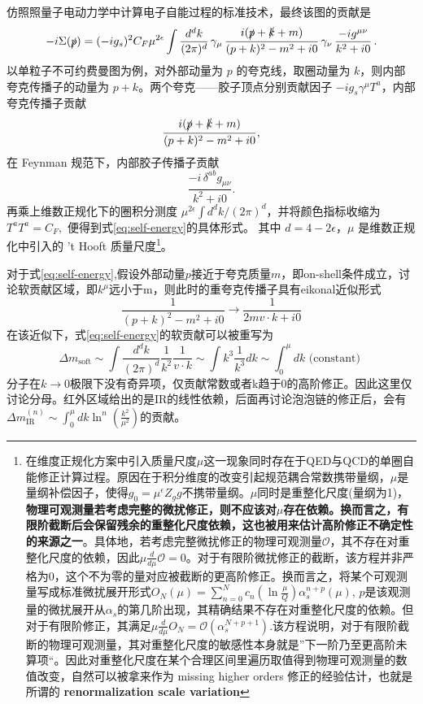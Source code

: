 仿照照量子电动力学中计算电子自能过程的标准技术，最终该图的贡献是
\begin{equation}
    -i \Sigma(\slashed{p})
=
(-i g_s)^2 C_F \mu^{2\epsilon}
\int \frac{d^d k}{(2\pi)^d}\,
\gamma_\mu\,
\frac{i(\slashed{p}+\slashed{k}+m)}{(p+k)^2-m^2+i0}\,
\gamma_\nu\,
\frac{-i g^{\mu\nu}}{k^2+i0}\,.
\label{eq:self-energy}
\end{equation}
以单粒子不可约费曼图为例，对外部动量为 $p$ 的夸克线，取圈动量为 $k$，则内部夸克传播子的动量为 $p+k$。两个夸克——胶子顶点分别贡献因子 $-ig_s\gamma^\mu T^a$，内部夸克传播子贡献
\[
\frac{i(\slashed p+\slashed k+m)}{(p+k)^2-m^2+i0},
\]
在 Feynman 规范下，内部胶子传播子贡献
\[
\frac{-i\,\delta^{ab}g_{\mu\nu}}{k^2+i0}.
\]
再乘上维数正规化下的圈积分测度 $\mu^{2\epsilon}\!\int d^d k/(2\pi)^d$，并将颜色指标收缩为$T^aT^a=C_F,$
便得到式\eqref{eq:self-energy}的具体形式。 
其中 $d=4-2\epsilon$，$\mu$ 是维数正规化中引入的 ’t Hooft 质量尺度\footnote{在维度正规化方案中引入质量尺度$\mu$这一现象同时存在于QED与QCD的单圈自能修正计算过程。原因在于积分维度的改变引起规范耦合常数携带量纲，$\mu$是量纲补偿因子，使得$g_0=\mu^{\epsilon}Z_g g$不携带量纲。$\mu$同时是重整化尺度(量纲为1)，\textbf{物理可观测量若考虑完整的微扰修正，则不应该对$\mu$存在依赖。换而言之，有限阶截断后会保留残余的重整化尺度依赖，这也被用来估计高阶修正不确定性的来源之一}。具体地，若考虑完整微扰修正的物理可观测量$\mathcal{O}$，其不存在对重整化尺度的依赖，因此$\mu\frac{d}{d \mu}\mathcal{O}=0$。对于有限阶微扰修正的截断，该方程并非严格为0，这个不为零的量对应被截断的更高阶修正。换而言之，将某个可观测量写成标准微扰展开形式$O_N(\mu)=\sum_{n=0}^N c_n\left(\ln \frac{\mu}{Q}\right) \alpha_s^{n+p}(\mu)$, $p$是该观测量的微扰展开从$\alpha_s$的第几阶出现，其精确结果不存在对重整化尺度的依赖。但对于有限阶修正，其满足$\mu \frac{d}{d \mu} O_N=\mathcal{O}\left(\alpha_s^{N+p+1}\right)$.该方程说明，对于有限阶截断的物理可观测量，其对重整化尺度的敏感性本身就是”下一阶乃至更高阶未算项“。因此对重整化尺度在某个合理区间里遍历取值得到物理可观测量的数值改变，自然可以被拿来作为 missing higher orders 修正的经验估计，也就是所谓的 \textbf{renormalization scale variation}}。

对于式\eqref{eq:self-energy},假设外部动量$p$接近于夸克质量$m$，即on-shell条件成立，讨论软贡献区域，即$k^\mu$远小于m，则此时的重夸克传播子具有eikonal近似形式
$$
\frac{1}{(p+k)^2-m^2+i 0} \rightarrow \frac{1}{2 m v \cdot k+i 0}
$$
在该近似下，式\eqref{eq:self-energy}的软贡献可以被重写为
$$
\Delta m_{\mathrm{soft}} \sim \int \frac{d^d k}{(2 \pi)^d} \frac{1}{k^2} \frac{1}{v \cdot k}\sim\int k^3 \frac{1}{k^3}dk \sim \int_0^\mu d k \text { (constant) }
$$
分子在$k\to 0$极限下没有奇异项，仅贡献常数或者k趋于0的高阶修正。因此这里仅讨论分母。红外区域给出的是IR的线性依赖，后面再讨论泡泡链的修正后，会有$\Delta m_{\mathrm{IR}}^{(n)} \sim \int_0^\mu d k \ln ^n\left(\frac{k^2}{\mu^2}\right)$的贡献。

